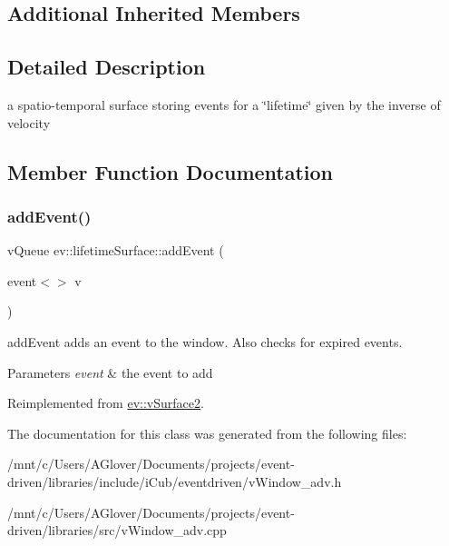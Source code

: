 \subsection*{Additional Inherited Members}


\subsection{Detailed Description}
a spatio-\/temporal surface storing events for a \char`\"{}lifetime\char`\"{} given by the inverse of velocity 

\subsection{Member Function Documentation}
\mbox{\label{classev_1_1lifetimeSurface_a8fce037a13281c0e46c7d660e0ea2275}} 
\subsubsection{\texorpdfstring{add\+Event()}{addEvent()}}
{\footnotesize\ttfamily v\+Queue ev\+::lifetime\+Surface\+::add\+Event (\begin{DoxyParamCaption}\item[{event$<$$>$}]{v }\end{DoxyParamCaption})\hspace{0.3cm}{\ttfamily [virtual]}}



add\+Event adds an event to the window. Also checks for expired events. 


\begin{DoxyParams}{Parameters}
{\em event} & the event to add \\
\hline
\end{DoxyParams}


Reimplemented from \hyperlink{classev_1_1vSurface2_a6dee662976048b73d7b19e45871352da}{ev\+::v\+Surface2}.



The documentation for this class was generated from the following files\+:\begin{DoxyCompactItemize}
\item 
/mnt/c/\+Users/\+A\+Glover/\+Documents/projects/event-\/driven/libraries/include/i\+Cub/eventdriven/v\+Window\+\_\+adv.\+h\item 
/mnt/c/\+Users/\+A\+Glover/\+Documents/projects/event-\/driven/libraries/src/v\+Window\+\_\+adv.\+cpp\end{DoxyCompactItemize}
